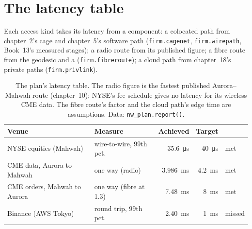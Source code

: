 \label{lst:nw:build-a-connectivity-plan:plan}

\section{The latency table}

Each access kind takes its latency from a component: a colocated path from chapter~2's cage and chapter~5's software path
(\texttt{firm.cagenet}, \texttt{firm.wirepath}, Book~13's measured stages); a radio route from its published figure; a fibre route
from the geodesic and a  (\texttt{firm.fibreroute}); a cloud path from chapter~18's private paths
(\texttt{firm.privlink}).

\label{lst:nw:build-a-connectivity-plan:latency}

\begin{table}[ht]
\centering\small
\begin{tabular}{@{}llrrl@{}}
\toprule
Venue & Measure & Achieved & Target & \\
\midrule
NYSE equities (Mahwah) & wire-to-wire, 99th pct. & \qty{35.6}{\micro\second} & \qty{40}{\micro\second} & met \\
CME data, Aurora to Mahwah & one way (radio) & \qty{3.986}{\milli\second} & \qty{4.2}{\milli\second} & met \\
CME orders, Mahwah to Aurora & one way (fibre at 1.3) & \qty{7.48}{\milli\second} & \qty{8}{\milli\second} & met \\
Binance (AWS Tokyo) & round trip, 99th pct. & \qty{2.40}{\milli\second} & \qty{1}{\milli\second} & missed \\
\bottomrule
\end{tabular}
\caption{The plan's latency table. The radio figure is the fastest published Aurora--Mahwah route (chapter~10); NYSE's fee schedule
gives no latency for its wireless CME data. The fibre route's factor and the cloud path's edge time are assumptions. Data:
\texttt{nw\_plan.report()}.}\label{tab:nw:build-a-connectivity-plan:latency}
\end{table}

